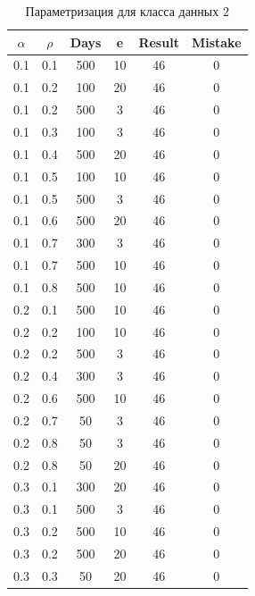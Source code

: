 \begin{center}
    \captionsetup{justification=raggedright,singlelinecheck=off}
    \begin{longtable}[c]{|c|c|c|c|c|c|}
    \caption{Параметризация для класса данных 2\label{tbl:table_kd2}}\\ \hline
        $\alpha$ & $\rho$ & Days & e & Result & Mistake \\ \hline
        0.1 &  0.1 &  500 &   10 &    46 &     0 \\ \hline
        0.1 &  0.2 &  100 &   20 &    46 &     0 \\ \hline
        0.1 &  0.2 &  500 &    3 &    46 &     0 \\ \hline
        0.1 &  0.3 &  100 &    3 &    46 &     0 \\ \hline
        0.1 &  0.4 &  500 &   20 &    46 &     0 \\ \hline
        0.1 &  0.5 &  100 &   10 &    46 &     0 \\ \hline
        0.1 &  0.5 &  500 &    3 &    46 &     0 \\ \hline
        0.1 &  0.6 &  500 &   20 &    46 &     0 \\ \hline
        0.1 &  0.7 &  300 &    3 &    46 &     0 \\ \hline
        0.1 & 0.7 & 500 & 10 & 46 & 0 \\ \hline
        0.1 & 0.8 & 500 & 10 & 46 & 0 \\ \hline
        0.2 & 0.1 & 500 & 10 & 46 & 0 \\ \hline
        0.2 & 0.2 & 100 & 10 & 46 & 0 \\ \hline
        0.2 & 0.2 & 500 & 3 & 46 & 0 \\ \hline
        0.2 & 0.4 & 300 & 3 & 46 & 0 \\ \hline
        0.2 & 0.6 & 500 & 10 & 46 & 0 \\ \hline
        0.2 & 0.7 & 50 & 3 & 46 & 0 \\ \hline
        0.2 & 0.8 & 50 & 3 & 46 & 0 \\ \hline
        0.2 & 0.8 & 50 & 20 & 46 & 0 \\ \hline
        0.3 & 0.1 & 300 & 20 & 46 & 0 \\ \hline
        0.3 & 0.1 & 500 & 3 & 46 & 0 \\ \hline
        0.3 & 0.2 & 500 & 10 & 46 & 0 \\ \hline
        0.3 & 0.2 & 500 & 20 & 46 & 0 \\ \hline
        0.3 & 0.3 & 50 & 20 & 46 & 0 \\ \hline

\end{longtable}
\end{center}
